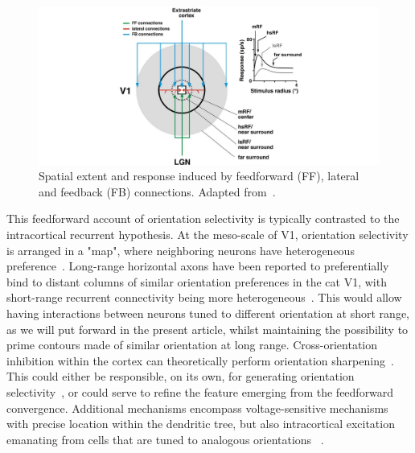 \begin{figure}[h!tbp]
\vspace{0.1cm}
\centering
\includegraphics[width=1.\textwidth]{fig/chap4_angelucci.pdf}
\caption[Spatial extent of \gls{V1} connections.]{Spatial extent and response induced by feedforward (FF), lateral and feedback (FB) connections. Adapted from~\cite{angelucci2006contribution}.}
\label{fig_chap4_angelucci}
\end{figure}

This feedforward account of orientation selectivity is typically contrasted to the intracortical recurrent hypothesis. At the meso-scale of \gls{V1}, orientation selectivity is arranged in a "map", where neighboring neurons have heterogeneous preference~\cite{grinvald1986functional}. Long-range horizontal axons have been reported to preferentially bind to distant columns of similar orientation preferences in the cat \gls{V1}, with short-range recurrent connectivity being more heterogeneous~\cite{chavane2011lateral, chavane2022revisiting}. This would allow having interactions between neurons tuned to different orientation at short range, as we will put forward in the present article, whilst maintaining the possibility to prime contours made of similar orientation at long range. Cross-orientation inhibition within the cortex can theoretically perform orientation sharpening~\cite{priebe2012mechanisms}. This could either be responsible, on its own, for generating orientation selectivity~\cite{hansel2012mechanism}, or could serve to refine the feature emerging from the feedforward convergence. Additional mechanisms encompass voltage-sensitive mechanisms with precise location within the dendritic tree, but also intracortical excitation emanating from cells that are tuned to analogous orientations ~\cite{vidyasagar1996multiple, priebe2012mechanisms,vidyasagar2015origins}.

